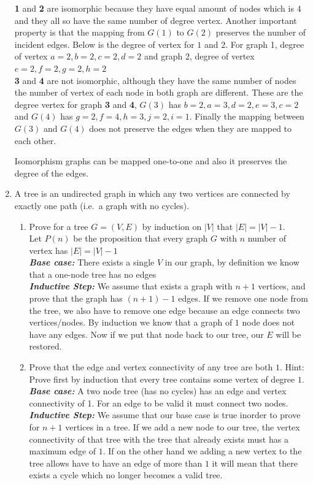 \documentclass[12pt]{article}
\begin{document}
\begin{enumerate}
\textbf{1} and \textbf{2} are isomorphic because they have equal amount of nodes which  is $4$ and they all so have the same number of degree vertex. Another important property is that the mapping from $G(1)$ to $G(2)$ preserves the number of incident edges. Below is the degree of vertex for $1$ and $2$. For graph 1, degree of vertex $a=2, b=2, c=2, d=2$ and graph 2, degree of vertex $e=2, f=2, g=2, h=2$ \\

\textbf{3} and \textbf{4} are not isomorphic, although they have the same number of nodes the number of vertex of each node in both graph are different. These are the degree vertex for graph \textbf{3} and \textbf{4}, $G(3) $ has $b=2, a=3, d=2, e=3, c=2$ and $G(4)$ has $g=2, f=4, h=3, j=2, i=1$. Finally the mapping between $G(3)$ and $G(4)$ does not preserve the edges when they are mapped to each other.

Isomorphism graphs can be mapped one-to-one and also it preserves the degree of the edges.
\item A tree is an undirected graph in which any two vertices are connected by exactly one path (i.e.~a graph with no cycles).  
\begin{enumerate}
\item Prove for a tree $G=(V,E)$ by induction on $|V|$ that $|E|=|V|-1$. \\
    Let $P(n)$ be the proposition that every graph $G$ with $n$ number of vertex has  $|E|=|V|-1$ \\
    \textbf{\textit{Base case: }} There exists a single $V$ in our graph, by definition we know that a one-node tree has no edges \\
    \textbf{\textit{Inductive Step: }} We assume that exists a graph with $n+1$ vertices, and prove that the graph has $(n+1)-1$ edges. If we remove one node from the tree, we also have to remove one edge because an edge connects two vertices/nodes. By induction we know that a graph of $1$ node does not have any edges. Now if we put that node back to our tree, our $E$ will be restored.
    
\item Prove that the edge and vertex connectivity of any tree are both $1$. Hint: Prove first by induction that every tree contains some vertex of degree $1$.\\
    \textbf{\textit{Base case: }} A two node tree (has no cycles) has an edge and vertex connectivity of 1. For an edge to be valid it must connect two nodes.
    \textbf{\textit{Inductive Step: }} We assume that our base case is true inorder to prove for $n+1$ vertices in a tree. If we add a new node to our tree, the vertex connectivity of that tree with the tree that already exists must has a maximum edge of $1$. If on the other hand we adding a new vertex to the tree allows have to have an edge of more than $1$ it will mean that there exists a cycle which no longer becomes a valid tree.


\end{enumerate}
\end{enumerate}
\end{document}
